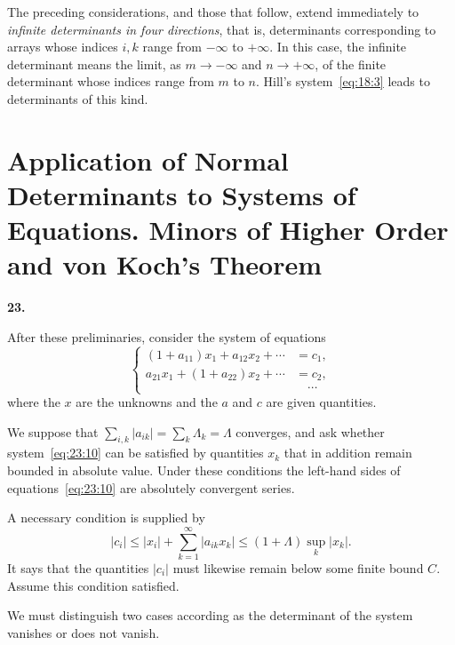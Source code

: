 \documentclass[
  paper=b5,
  fontsize=13pt,
  twoside=true,
  open=any,
  bookmarkpackage=false,
  chapterprefix=true,
  headings=normal
]{scrbook}
\theoremstyle{definition}
\newcommand{\numberedparagraph}[1]{%
  \par\medskip\phantomsection\label{sec:#1}%
  \noindent\textbf{#1.}\enspace
}
\begin{document}
The preceding considerations, and those that follow, extend immediately to \emph{infinite determinants in four directions}, that is, determinants corresponding to arrays whose indices $i,k$ range from $-\infty$ to $+\infty$. In this case, the infinite determinant means the limit, as $m\to-\infty$ and $n\to+\infty$, of the finite determinant whose indices range from $m$ to $n$. Hill's system~\eqref{eq:18:3} leads to determinants of this kind.

\section{Application of Normal Determinants to Systems of Equations. Minors of Higher Order and von Koch's Theorem}

\numberedparagraph{23}
After these preliminaries, consider the system of equations
\begin{equation}
\left\{
\begin{aligned}
 (1+a_{11})x_1+a_{12}x_2+\cdots&=c_1,\\
 a_{21}x_1+(1+a_{22})x_2+\cdots&=c_2,\\
 &\hspace{1em}\cdots
\end{aligned}
\right.
\tag{10}\label{eq:23:10}
\end{equation}
where the $x$ are the unknowns and the $a$ and $c$ are given quantities.

We suppose that $\sum_{i,k}|a_{ik}|=\sum_k\Lambda_k=\Lambda$ converges, and ask whether system~\eqref{eq:23:10} can be satisfied by quantities $x_k$ that in addition remain bounded in absolute value. Under these conditions the left-hand sides of equations~\eqref{eq:23:10} are absolutely convergent series.

A necessary condition is supplied by
\[
 |c_i|\leq|x_i|+\sum_{k=1}^{\infty}|a_{ik}x_k|
 \leq(1+\Lambda)\sup_k|x_k|.
\]
It says that the quantities $|c_i|$ must likewise remain below some finite bound $C$. Assume this condition satisfied.

We must distinguish two cases according as the determinant of the system vanishes or does not vanish.
\end{document}
